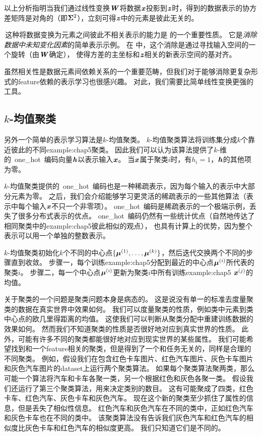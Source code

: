 以上分析指明当我们通过线性变换$\boldsymbol{\mathit{W}}$将数据$\boldsymbol{\mathit{x}}$投影到$\boldsymbol{\mathit{z}}$时，得到的数据表示的协方差矩阵是对角的（即$\boldsymbol{\Sigma}^2$），立刻可得$\boldsymbol{\mathit{z}}$中的元素是彼此无关的。

\,这种将数据变换为元素之间彼此不相关表示的能力是\,\,的一个重要性质。
它是\emph{消除数据中未知变化因素}的简单表示示例。
在\,\,中，这个消除是通过寻找输入空间的一个旋转（由$\boldsymbol{\mathit{W}}$确定），
使得方差的主坐标和$\boldsymbol{\mathit{z}}$相关的新表示空间的基对齐。


虽然相关性是数据元素间依赖关系的一个重要范畴，但我们对于能够消除更复杂形式的\gls{feature}依赖的表示学习也很感兴趣。
对此，我们需要比简单线性变换更强的工具。

\subsection{$k$-均值聚类}
\label{sec:k_means_clustering}
另外一个简单的表示学习算法是$k$-均值聚类。
$k$-均值聚类算法将训练集分成$k$个靠近彼此的不同\gls{example:chap5}聚类。
因此我们可以认为该算法提供了$k$-维的~\gls{one_hot}~编码向量$\boldsymbol{\mathit{h}}$以表示输入$\boldsymbol{\mathit{x}}$。
当$\boldsymbol{\mathit{x}}$属于聚类$i$时，有$h_i=1$，$\boldsymbol{\mathit{h}}$的其他项为零。

$k$-均值聚类提供的~\gls{one_hot}~编码也是一种稀疏表示，因为每个输入的表示中大部分元素为零。
之后，我们会介绍能够学习更灵活的稀疏表示的一些其他算法（表示中每个输入$\boldsymbol{\mathit{x}}$不只一个非零项）。
\gls{one_hot}~编码是稀疏表示的一个极端示例，丢失了很多分布式表示的优点。
\gls{one_hot}~编码仍然有一些统计优点（自然地传达了相同聚类中的\gls{example:chap5}彼此相似的观点），
也具有计算上的优势，因为整个表示可以用一个单独的整数表示。

$k$-均值聚类初始化$k$个不同的中心点$\{\boldsymbol{\mu}^{(1)},\dots,\boldsymbol{\mu}^{(k)}\}$，然后迭代交换两个不同的步骤直到收敛。
步骤一，每个训练\gls{example:chap5}分配到最近的中心点$\boldsymbol{\mu}^{(i)}$所代表的聚类$i$。
步骤二，每一个中心点$\boldsymbol{\mu}^{(i)}$更新为聚类$i$中所有训练\gls{example:chap5} $\boldsymbol{\mathit{x}}^{(j)}$的均值。

关于聚类的一个问题是聚类问题本身是病态的。
这是说没有单一的标准去度量聚类的数据在真实世界中效果如何。
我们可以度量聚类的性质，例如类中元素到类中心点的欧几里得距离的均值。
这使我们可以判断从聚类分配中重建训练数据的效果如何。
然而我们不知道聚类的性质是否很好地对应到真实世界的性质。
此外，可能有许多不同的聚类都能很好地对应到现实世界的某些属性。
我们可能希望找到和一个\gls{feature}相关的聚类，但是得到了一个和任务无关的，同样是合理的不同聚类。
例如，假设我们在包含红色卡车图片、红色汽车图片、灰色卡车图片和灰色汽车图片的\gls{dataset}上运行两个聚类算法。
如果每个聚类算法聚两类，那么可能一个算法将汽车和卡车各聚一类，另一个根据红色和灰色各聚一类。
假设我们还运行了第三个聚类算法，用来决定类别的数目。
这有可能聚成了四类，红色卡车、红色汽车、灰色卡车和灰色汽车。
现在这个新的聚类至少抓住了属性的信息，但是丢失了相似性信息。
红色汽车和灰色汽车在不同的类中，正如红色汽车和灰色卡车也在不同的类中。
该聚类算法没有告诉我们灰色汽车和红色汽车的相似度比灰色卡车和红色汽车的相似度更高。
我们只知道它们是不同的。

